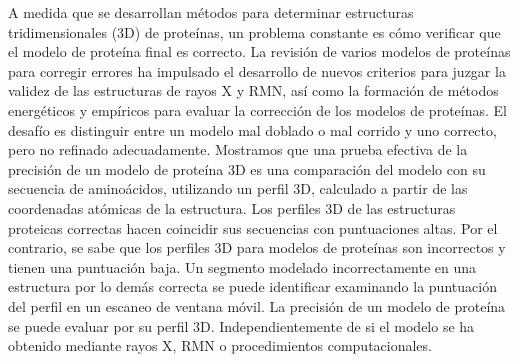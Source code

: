 \documentclass[11pt, letterpaper, spanish]{article}
\begin{document}
{{{\par{A medida que se desarrollan métodos para determinar estructuras tridimensionales (3D) de proteínas, un problema constante es cómo verificar que el modelo de proteína final es correcto. La revisión de varios modelos de proteínas para corregir errores ha impulsado el desarrollo de nuevos criterios para juzgar la validez de las estructuras de rayos X y RMN, así como la formación de métodos energéticos y empíricos para evaluar la corrección de los modelos de proteínas. El desafío es distinguir entre un modelo mal doblado o mal corrido y uno correcto, pero no refinado adecuadamente. Mostramos que una prueba efectiva de la precisión de un modelo de proteína 3D es una comparación del modelo con su secuencia de aminoácidos, utilizando un perfil 3D, calculado a partir de las coordenadas atómicas de la estructura. Los perfiles 3D de las estructuras proteicas correctas hacen coincidir sus secuencias con puntuaciones altas. Por el contrario, se sabe que los perfiles 3D para modelos de proteínas son incorrectos y tienen una puntuación baja. Un segmento modelado incorrectamente en una estructura por lo demás correcta se puede identificar examinando la puntuación del perfil en un escaneo de ventana móvil. La precisión de un modelo de proteína se puede evaluar por su perfil 3D. Independientemente de si el modelo se ha obtenido mediante rayos X, RMN o procedimientos computacionales.}

}}}
\end{document}
